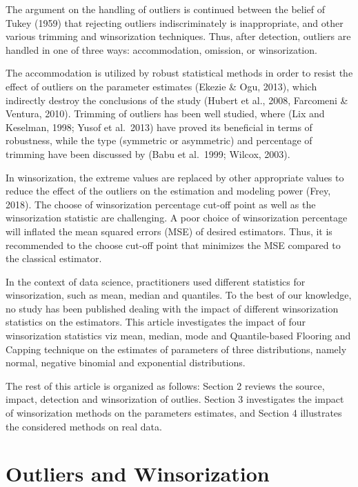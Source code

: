 \documentclass[
]{article}
\begin{document}
The argument on the handling of outliers is continued between the belief
of Tukey (1959) that rejecting outliers indiscriminately is
inappropriate, and other various trimming and winsorization techniques.
Thus, after detection, outliers are handled in one of three ways:
accommodation, omission, or winsorization.

The accommodation is utilized by robust statistical methods in order to
resist the effect of outliers on the parameter estimates (Ekezie \& Ogu,
2013), which indirectly destroy the conclusions of the study (Hubert et
al., 2008, Farcomeni \& Ventura, 2010). Trimming of outliers has been
well studied, where (Lix and Keselman, 1998; Yusof et al.~2013) have
proved its beneficial in terms of robustness, while the type (symmetric
or asymmetric) and percentage of trimming have been discussed by (Babu
et al.~1999; Wilcox, 2003).

In winsorization, the extreme values are replaced by other appropriate
values to reduce the effect of the outliers on the estimation and
modeling power (Frey, 2018). The choose of winsorization percentage
cut-off point as well as the winsorization statistic are challenging. A
poor choice of winsorization percentage will inflated the mean squared
errors (MSE) of desired estimators. Thus, it is recommended to the
choose cut-off point that minimizes the MSE compared to the classical
estimator.

In the context of data science, practitioners used different statistics
for winsorization, such as mean, median and quantiles. To the best of
our knowledge, no study has been published dealing with the impact of
different winsorization statistics on the estimators. This article
investigates the impact of four winsorization statistics viz mean,
median, mode and Quantile-based Flooring and Capping technique on the
estimates of parameters of three distributions, namely normal, negative
binomial and exponential distributions.

The rest of this article is organized as follows: Section 2 reviews the
source, impact, detection and winsorization of outlies. Section 3
investigates the impact of winsorization methods on the parameters
estimates, and Section 4 illustrates the considered methods on real
data.

\hypertarget{outliers-and-winsorization}{%
\section{Outliers and Winsorization}\label{outliers-and-winsorization}}
\end{document}
